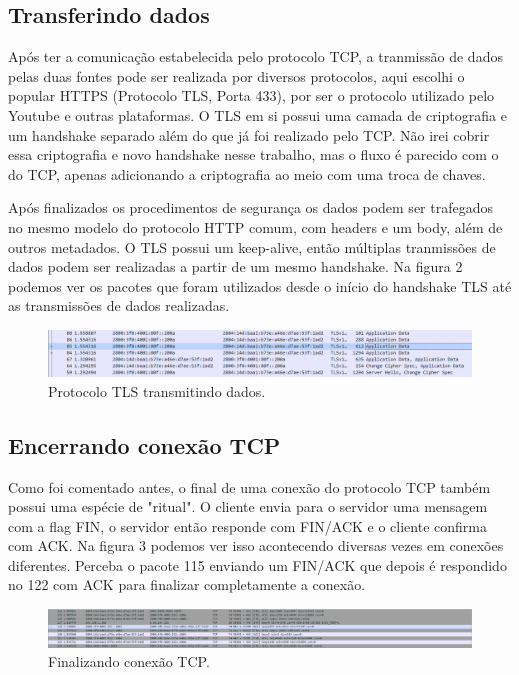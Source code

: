 \documentclass[12pt]{article}
\begin{document}
\subsection{Transferindo dados}

Após ter a comunicação estabelecida pelo protocolo TCP, a tranmissão de dados pelas duas fontes pode ser realizada por diversos protocolos, aqui escolhi o popular HTTPS (Protocolo TLS, Porta 433), por ser o protocolo utilizado pelo Youtube e outras plataformas. O TLS em si possui uma camada de criptografia e um handshake separado além do que já foi realizado pelo TCP. Não irei cobrir essa criptografia e novo handshake nesse trabalho, mas o fluxo é parecido com o do TCP, apenas adicionando a criptografia ao meio com uma troca de chaves.

Após finalizados os procedimentos de segurança os dados podem ser trafegados no mesmo modelo do protocolo HTTP comum, com headers e um body, além de outros metadados. O TLS possui um keep-alive, então múltiplas tranmissões de dados podem ser realizadas a partir de um mesmo handshake. Na figura 2 podemos ver os pacotes que foram utilizados desde o início do handshake TLS até as transmissões de dados realizadas.

\begin{figure}[H]
    \centering
    \includegraphics[width=\linewidth]{https_packages.png}
    \caption{Protocolo TLS transmitindo dados.}
\end{figure}

\subsection{Encerrando conexão TCP}

Como foi comentado antes, o final de uma conexão do protocolo TCP também possui uma espécie de "ritual". O cliente envia para o servidor uma mensagem com a flag FIN, o servidor então responde com FIN/ACK e o cliente confirma com ACK. Na figura 3 podemos ver isso acontecendo diversas vezes em conexões diferentes. Perceba o pacote 115 enviando um FIN/ACK que depois é respondido no 122 com ACK para finalizar completamente a conexão.

\begin{figure}[H]
    \centering
    \includegraphics[width=\linewidth]{tcp_end.png}
    \caption{Finalizando conexão TCP.}
\end{figure}
\end{document}
